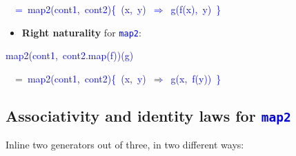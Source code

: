 \begin{itemize}
\begin{lyxcode}
\textcolor{blue}{\footnotesize{}~~=~map2(cont1,~cont2)\{~(x,~y)~$\Rightarrow$~g(f(x),~y)~\}}{\footnotesize\par}
\end{lyxcode}
\begin{itemize}
\item \textbf{Right naturality} for \texttt{\textcolor{blue}{\footnotesize{}map2}}:
\end{itemize}
\begin{lyxcode}
\textcolor{blue}{\footnotesize{}map2(cont1,~cont2.map(f))(g)}{\footnotesize\par}

\textcolor{blue}{\footnotesize{}~~=~map2(cont1,~cont2)\{~(x,~y)~$\Rightarrow$~g(x,~f(y))~\}}{\footnotesize\par}
\end{lyxcode}
\end{itemize}


\subsection{Associativity and identity laws for \texttt{\textcolor{blue}{\footnotesize{}map2}} }

\vspace{-0.1cm}Inline two generators out of three, in two different
ways:\texttt{\textcolor{blue}{\footnotesize{}\smallskip{}
}}{\footnotesize\par}

